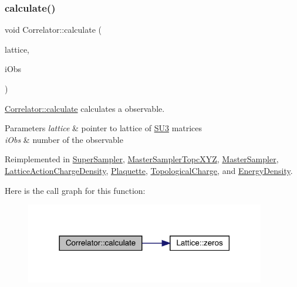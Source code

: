 \subsubsection{\texorpdfstring{calculate()}{calculate()}}
{\footnotesize\ttfamily void Correlator\+::calculate (\begin{DoxyParamCaption}\item[{\mbox{\hyperlink{class_lattice}{Lattice}}$<$ \mbox{\hyperlink{class_s_u3}{S\+U3}} $>$ $\ast$}]{lattice,  }\item[{unsigned int}]{i\+Obs }\end{DoxyParamCaption})\hspace{0.3cm}{\ttfamily [virtual]}}



\mbox{\hyperlink{class_correlator_ab33502ff305f891c5c2e6d66a26a0247}{Correlator\+::calculate}} calculates a observable. 


\begin{DoxyParams}{Parameters}
{\em lattice} & pointer to lattice of \mbox{\hyperlink{class_s_u3}{S\+U3}} matrices \\
\hline
{\em i\+Obs} & number of the observable \\
\hline
\end{DoxyParams}


Reimplemented in \mbox{\hyperlink{class_super_sampler_a7e1457583270077c4fbcb288ea9b954c}{Super\+Sampler}}, \mbox{\hyperlink{class_master_sampler_topc_x_y_z_a0ea80ad9935db791f00461b7dfd548b7}{Master\+Sampler\+Topc\+X\+YZ}}, \mbox{\hyperlink{class_master_sampler_ad3cc7e36498dbf4a39238de3ac59ae8b}{Master\+Sampler}}, \mbox{\hyperlink{class_lattice_action_charge_density_a3dddc75188042c645fbdd1c8b3e80c8a}{Lattice\+Action\+Charge\+Density}}, \mbox{\hyperlink{class_plaquette_a40cae6fd587c14836bdf61e69c615a00}{Plaquette}}, \mbox{\hyperlink{class_topological_charge_a8ed78c28c3484df04b1cb24187de2f5b}{Topological\+Charge}}, and \mbox{\hyperlink{class_energy_density_ae8e5e29257104d881bcabeadc3b2c9e7}{Energy\+Density}}.

Here is the call graph for this function\+:\nopagebreak
\begin{figure}[H]
\begin{center}
\leavevmode
\includegraphics[width=297pt]{class_correlator_ab33502ff305f891c5c2e6d66a26a0247_cgraph}
\end{center}
\end{figure}
\mbox{\label{class_correlator_ac780d8b180294ee4801ede6e6a13f7f4}} 
